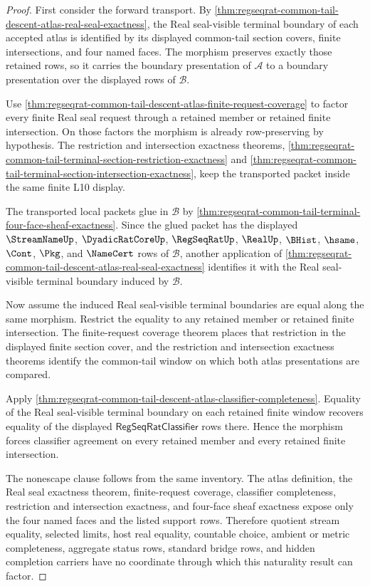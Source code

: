 \begin{proof}
First consider the forward transport. By \autoref{thm:regseqrat-common-tail-descent-atlas-real-seal-exactness}, the Real seal-visible terminal boundary of each accepted atlas is identified by its displayed common-tail section covers, finite intersections, and four named faces. The morphism preserves exactly those retained rows, so it carries the boundary presentation of $\mathcal A$ to a boundary presentation over the displayed rows of $\mathcal B$.

Use \autoref{thm:regseqrat-common-tail-descent-atlas-finite-request-coverage} to factor every finite Real seal request through a retained member or retained finite intersection. On those factors the morphism is already row-preserving by hypothesis. The restriction and intersection exactness theorems, \autoref{thm:regseqrat-common-tail-terminal-section-restriction-exactness} and \autoref{thm:regseqrat-common-tail-terminal-section-intersection-exactness}, keep the transported packet inside the same finite L10 display.

The transported local packets glue in $\mathcal B$ by \autoref{thm:regseqrat-common-tail-terminal-four-face-sheaf-exactness}. Since the glued packet has the displayed $\StreamNameUp$, $\DyadicRatCoreUp$, $\RegSeqRatUp$, $\RealUp$, $\BHist$, $\hsame$, $\Cont$, $\Pkg$, and $\NameCert$ rows of $\mathcal B$, another application of \autoref{thm:regseqrat-common-tail-descent-atlas-real-seal-exactness} identifies it with the Real seal-visible terminal boundary induced by $\mathcal B$.

Now assume the induced Real seal-visible terminal boundaries are equal along the same morphism. Restrict the equality to any retained member or retained finite intersection. The finite-request coverage theorem places that restriction in the displayed finite section cover, and the restriction and intersection exactness theorems identify the common-tail window on which both atlas presentations are compared.

Apply \autoref{thm:regseqrat-common-tail-descent-atlas-classifier-completeness}. Equality of the Real seal-visible terminal boundary on each retained finite window recovers equality of the displayed $\mathsf{RegSeqRatClassifier}$ rows there. Hence the morphism forces classifier agreement on every retained member and every retained finite intersection.

The nonescape clause follows from the same inventory. The atlas definition, the Real seal exactness theorem, finite-request coverage, classifier completeness, restriction and intersection exactness, and four-face sheaf exactness expose only the four named faces and the listed support rows. Therefore quotient stream equality, selected limits, host real equality, countable choice, ambient or metric completeness, aggregate status rows, standard bridge rows, and hidden completion carriers have no coordinate through which this naturality result can factor.
\end{proof}

